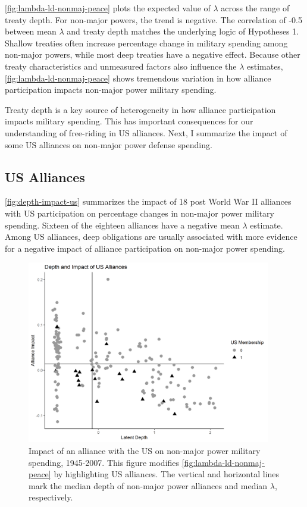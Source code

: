 \documentclass[12pt]{article}
\begin{document}
\autoref{fig:lambda-ld-nonmaj-peace} plots the expected value of $\lambda$ across the range of treaty depth. 
For non-major powers, the trend is negative.
The correlation of -0.5 between mean $\lambda$ and treaty depth matches the underlying logic of Hypotheses 1. 
Shallow treaties often increase  percentage change in military spending among non-major powers, while most deep treaties have a negative effect. 
Because other treaty characteristics and unmeasured factors also influence the $\lambda$ estimates, \autoref{fig:lambda-ld-nonmaj-peace} shows tremendous variation in how alliance participation impacts non-major power military spending. 



Treaty depth is a key source of heterogeneity in how alliance participation impacts military spending. 
This has important consequences for our understanding of free-riding in US alliances. 
Next, I summarize the impact of some US alliances on non-major power defense spending. 


\subsection{US Alliances}


\autoref{fig:depth-impact-us} summarizes the impact of 18 post World War II alliances with US participation on percentage changes in non-major power military spending.
Sixteen of the eighteen alliances have a negative mean $\lambda$ estimate. 
Among US alliances, deep obligations are usually associated with more evidence for a negative impact of alliance participation on non-major power spending. 


\begin{figure}[htbp]
	\centering
		\includegraphics[width=0.95\textwidth]{../figures/lambda-depth-us.png}
	\caption{Impact of an alliance with the US on non-major power military spending, 1945-2007. This figure modifies \autoref{fig:lambda-ld-nonmaj-peace} by highlighting US alliances. The vertical and horizontal lines mark the median depth of non-major power alliances and median $\lambda$, respectively.}
	\label{fig:depth-impact-us}
\end{figure}
\end{document}
